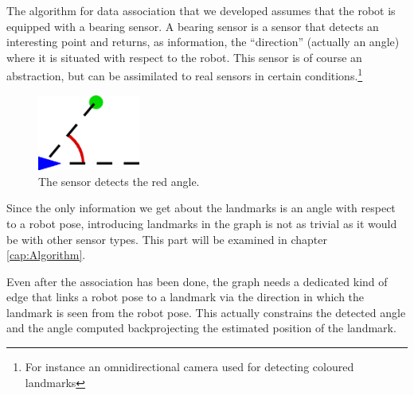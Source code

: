 The algorithm for data association that we developed assumes that the robot is equipped with a bearing sensor. A bearing sensor is a sensor that detects an interesting point and returns, as information, the ``direction'' (actually an angle) where it is situated with respect to the robot.
This sensor is of course an abstraction, but can be assimilated to real sensors in certain conditions.\footnote{For instance an omnidirectional camera used for detecting coloured landmarks}

\begin{figure}[htbp]
  \centering
    \includegraphics[width=0.3\textwidth]{images/bearing_sensor.png}
  \caption{The sensor detects the red angle.}
  \label{fig:bearing_sensor}
\end{figure}

Since the only information we get about the landmarks is an angle with respect to a robot pose, introducing landmarks in the graph is not as trivial as it would be with other sensor types. This part will be examined in chapter \ref{cap:Algorithm}.

Even after the association has been done, the graph needs a dedicated kind of edge that links a robot pose to a landmark via the direction in which the landmark is seen from the robot pose. This actually constrains the detected angle and the angle computed backprojecting the estimated position of the landmark.


